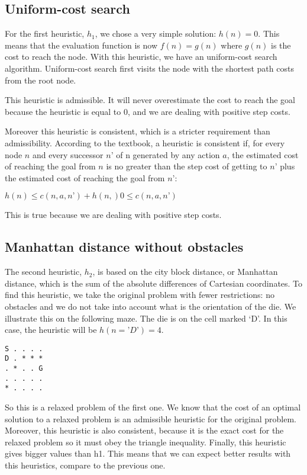 \documentclass[]{article}
\begin{document}
\subsection{Uniform-cost search}
For the first heuristic, $h_1$, we chose a very simple solution: $h(n) = 0$.
This means that the evaluation function is now $f(n) = g(n)$ where $g(n)$ is the cost to reach the node.
With this heuristic, we have an uniform-cost search algorithm.
Uniform-cost search first visits the node with the shortest path costs from the root node.

This heuristic is admissible.
It will never overestimate the cost to reach the goal because the heuristic is equal to 0, and we are dealing with positive step costs.

Moreover this heuristic is consistent, which is a stricter requirement than admissibility.
According to the textbook, a heuristic is consistent if, for every node $n$ and every successor $n’$ of n generated by any action $a$, the estimated cost of reaching the goal from $n$ is no greater than the step cost of getting to $n’$ plus the estimated cost of reaching the goal from $n’$:

$
h(n) \leq c(n,a,n’) + h(n,)

0 \leq c(n,a,n’)
$

This is true because we are dealing with positive step costs.

\subsection{Manhattan distance without obstacles}
The second heuristic, $h_2$, is based on the city block distance, or Manhattan distance, which is the sum of the absolute differences of Cartesian coordinates.
To find this heuristic, we take the original problem with fewer restrictions: no obstacles and we do not take into account what is the orientation of the die. 
We illustrate this on the following maze.
The die is on the cell marked ‘D’.
In this case, the heuristic will be $h(n=’D’) = 4$.

\begin{lstlisting}
S . . . .
D . * * *
. * . . G
. . . . .
* . . . .
\end{lstlisting}

So this is a relaxed problem of the first one.
We know that the cost of an optimal solution to a relaxed problem is an admissible heuristic for the original problem.
Moreover, this heuristic is also consistent, because it is the exact cost for the relaxed problem so it must obey the triangle inequality.
Finally, this heuristic gives bigger values than h1. This means that we can expect better results with this heuristics, compare to the previous one. 
\end{document}
